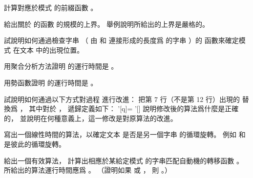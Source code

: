 \startsection[
  title={The Knuth-Morris-Pratt algorithm},
]

\startEXERCISE
計算對應於模式  的前綴函數 \m{\pi}。
\stopEXERCISE

\startANSWER
{}
\stopANSWER

\startEXERCISE
給出關於  的函數 \m{\pi^*[q]} 的規模的上界。
舉例說明所給出的上界是嚴格的。
\stopEXERCISE

\startANSWER
{}
\stopANSWER

\startEXERCISE
試說明如何通過檢查字串  （
由  和  連接形成的長度爲  的字串
）的 \m{\pi} 函數來確定模式  在文本  中的出現位置。
\stopEXERCISE

\startANSWER
{}
\stopANSWER

\startEXERCISE
用聚合分析方法證明  的運行時間是 。
\stopEXERCISE

\startANSWER
{}
\stopANSWER

\startEXERCISE
用勢函數證明  的運行時間是 。
\stopEXERCISE

\startANSWER
{}
\stopANSWER

\startEXERCISE
試說明如何通過以下方式對過程  進行改進：
把第 7 行（不是第 12 行）出現的 \m{\pi} 替換爲 ，
其中對於 ，  遞歸定義如下：
\startformula
\pi'[q]=\startcases
{} \NC {} \NR
\NC \pi'[\pi[q]] \NC {} \NR
\NC \pi[q] \NC {} \NR
\stopcases
\stopformula
說明修改後的算法爲什麼是正確的，
並說明在何種意義上，這一修改是對原算法的改進。
\stopEXERCISE

\startANSWER
{}
\stopANSWER

\startEXERCISE
寫出一個線性時間的算法，以確定文本  是否是另一個字串  的循環旋轉。
例如  和  是彼此的循環旋轉。
\stopEXERCISE

\startANSWER
{}
\stopANSWER

\startEXERCISE\DIFFICULT
給出一個有效算法，
計算出相應於某給定模式  的字串匹配自動機的轉移函數 \m{\delta}。
所給出的算法運行時間應爲 。
（\hint 證明如果  或 ，
則 。）
\stopEXERCISE

\startANSWER
{}
\stopANSWER

\stopsection
